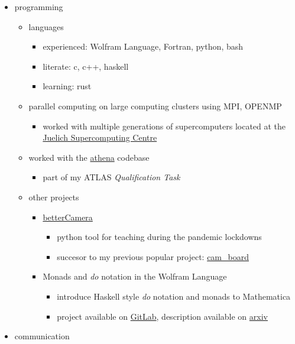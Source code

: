 \begin{itemize}
\tightlist
\item
  programming

  \begin{itemize}
  \tightlist
  \item
    languages

    \begin{itemize}
    \tightlist
    \item
      experienced: Wolfram Language, Fortran, python, bash
    \item
      literate: c, c++, haskell
    \item
      learning: rust
    \end{itemize}
  \item
    parallel computing on large computing clusters using MPI, OPENMP

    \begin{itemize}
    \tightlist
    \item
      worked with multiple generations of supercomputers located at the
      \href{https://www.fz-juelich.de/en/ias/jsc/systems/supercomputers}{Juelich
      Supercomputing Centre}
    \end{itemize}
  \item
    worked with the \href{https://gitlab.cern.ch/atlas/athena}{athena}
    codebase

    \begin{itemize}
    \tightlist
    \item
      part of my ATLAS \emph{Qualification Task}
    \end{itemize}
  \item
    other projects

    \begin{itemize}
    \tightlist
    \item
      \href{https://kacpertopol.github.io/betterCamera/}{betterCamera}

      \begin{itemize}
      \tightlist
      \item
        python tool for teaching during the pandemic lockdowns
      \item
        succesor to my previous popular project:
        \href{https://github.com/kacpertopol/cam_board}{cam\_board}
      \end{itemize}
    \item
      Monads and \emph{do} notation in the Wolfram Language

      \begin{itemize}
      \tightlist
      \item
        introduce Haskell style \emph{do} notation and monads to
        Mathematica
      \item
        project available on
        \href{https://gitlab.com/kacpertopolnicki/wlmonad}{GitLab},
        description available on
        \href{https://arxiv.org/abs/2005.09478}{arxiv}
      \end{itemize}
    \end{itemize}
  \end{itemize}
\item
  communication


\end{itemize}
